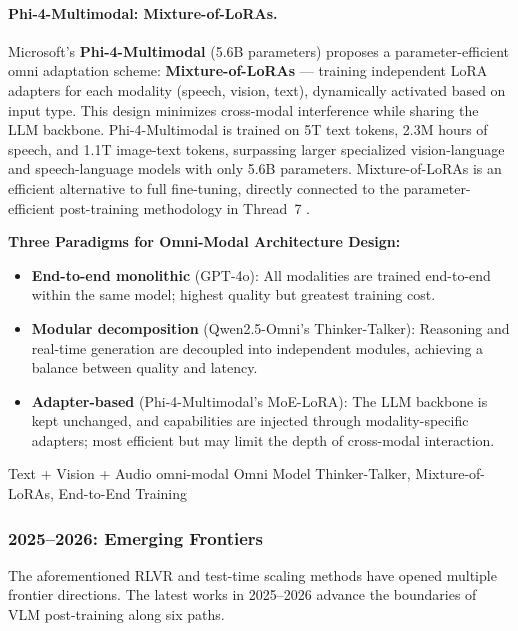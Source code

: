 \paragraph{Phi-4-Multimodal: Mixture-of-LoRAs.}
Microsoft's \textbf{Phi-4-Multimodal} \cite{abouelenin2025phi4mini} (5.6B parameters)
proposes a parameter-efficient omni adaptation scheme:
\textbf{Mixture-of-LoRAs} --- training independent LoRA adapters for each modality (speech, vision, text),
dynamically activated based on input type.
This design minimizes cross-modal interference while sharing the LLM backbone.
Phi-4-Multimodal is trained on 5T text tokens, 2.3M hours of speech, and 1.1T image-text tokens,
surpassing larger specialized vision-language and speech-language models with only 5.6B parameters.
Mixture-of-LoRAs is an efficient alternative to full fine-tuning,
directly connected to the parameter-efficient post-training methodology in Thread~7
.

\begin{solutionbox}
\textbf{Three Paradigms for Omni-Modal Architecture Design:}
\begin{itemize}[leftmargin=2em]
  \item \textbf{End-to-end monolithic} (GPT-4o):
    All modalities are trained end-to-end within the same model; highest quality but greatest training cost.
  \item \textbf{Modular decomposition} (Qwen2.5-Omni's Thinker-Talker):
    Reasoning and real-time generation are decoupled into independent modules,
    achieving a balance between quality and latency.
  \item \textbf{Adapter-based} (Phi-4-Multimodal's MoE-LoRA):
    The LLM backbone is kept unchanged, and capabilities are injected through modality-specific adapters;
    most efficient but may limit the depth of cross-modal interaction.
\end{itemize}
\end{solutionbox}

  {Text + Vision + Audio omni-modal Omni Model}
  {Thinker-Talker, Mixture-of-LoRAs, End-to-End Training}

\subsubsection{2025--2026: Emerging Frontiers}
\label{sec:t5-emerging}
\label{sec:t5-self-evolving}

The aforementioned RLVR and test-time scaling methods have opened multiple frontier directions.
The latest works in 2025--2026 advance the boundaries of VLM post-training along six paths.

